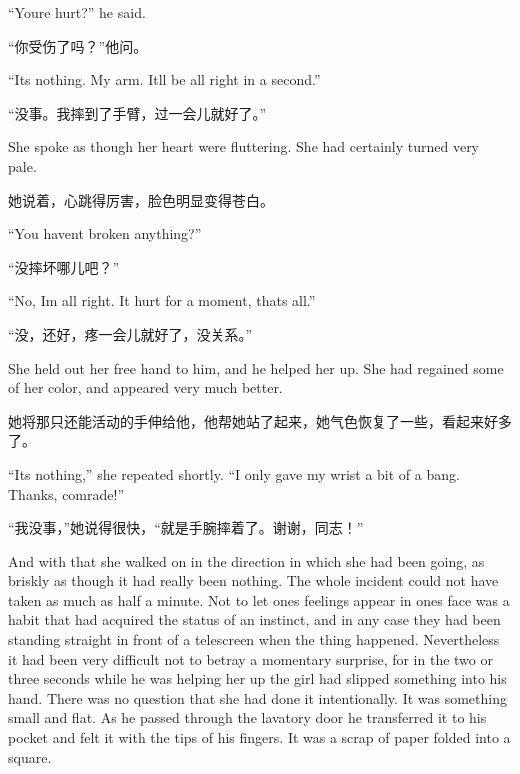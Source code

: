 \begin{paracol}{2}
\switchcolumn*

``You\textquotesingle re hurt?'' he said.

\switchcolumn

``你受伤了吗？''他问。

\switchcolumn*

``It\textquotesingle s nothing. My arm. It\textquotesingle ll be all
right in a second.''

\switchcolumn

``没事。我摔到了手臂，过一会儿就好了。''

\switchcolumn*

She spoke as though her heart were fluttering. She had certainly turned
very pale.

\switchcolumn

她说着，心跳得厉害，脸色明显变得苍白。

\switchcolumn*

``You haven\textquotesingle t broken anything?''

\switchcolumn

``没摔坏哪儿吧？''

\switchcolumn*

``No, I\textquotesingle m all right. It hurt for a moment,
that\textquotesingle s all.''

\switchcolumn

``没，还好，疼一会儿就好了，没关系。''

\switchcolumn*

She held out her free hand to him, and he helped her up. She had
regained some of her color, and appeared very much better.

\switchcolumn

她将那只还能活动的手伸给他，他帮她站了起来，她气色恢复了一些，看起来好多了。

\switchcolumn*

``It\textquotesingle s nothing,'' she repeated shortly. ``I only gave my
wrist a bit of a bang. Thanks, comrade!''

\switchcolumn

``我没事，''她说得很快，``就是手腕摔着了。谢谢，同志！''

\switchcolumn*

And with that she walked on in the direction in which she had been
going, as briskly as though it had really been nothing. The whole
incident could not have taken as much as half a minute. Not to let
one\textquotesingle s feelings appear in one\textquotesingle s face was
a habit that had acquired the status of an instinct, and in any case
they had been standing straight in front of a telescreen when the thing
happened. Nevertheless it had been very difficult not to betray a
momentary surprise, for in the two or three seconds while he was helping
her up the girl had slipped something into his hand. There was no
question that she had done it intentionally. It was something small and
flat. As he passed through the lavatory door he transferred it to his
pocket and felt it with the tips of his fingers. It was a scrap of paper
folded into a square.


\end{paracol}
